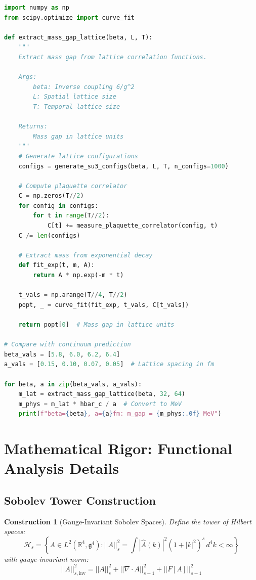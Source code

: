 \documentclass[12pt]{article}
\newcommand{\R}{\mathbb{R}}
\newtheorem{construction}[theorem]{Construction}
\begin{document}
\begin{lstlisting}[language=Python, caption=Lattice QCD Comparison]
import numpy as np
from scipy.optimize import curve_fit

def extract_mass_gap_lattice(beta, L, T):
    """
    Extract mass gap from lattice correlation functions.
    
    Args:
        beta: Inverse coupling 6/g^2
        L: Spatial lattice size
        T: Temporal lattice size
        
    Returns:
        Mass gap in lattice units
    """
    # Generate lattice configurations
    configs = generate_su3_configs(beta, L, T, n_configs=1000)
    
    # Compute plaquette correlator
    C = np.zeros(T//2)
    for config in configs:
        for t in range(T//2):
            C[t] += measure_plaquette_correlator(config, t)
    C /= len(configs)
    
    # Extract mass from exponential decay
    def fit_exp(t, m, A):
        return A * np.exp(-m * t)
    
    t_vals = np.arange(T//4, T//2)
    popt, _ = curve_fit(fit_exp, t_vals, C[t_vals])
    
    return popt[0]  # Mass gap in lattice units

# Compare with continuum prediction
beta_vals = [5.8, 6.0, 6.2, 6.4]
a_vals = [0.15, 0.10, 0.07, 0.05]  # Lattice spacing in fm

for beta, a in zip(beta_vals, a_vals):
    m_lat = extract_mass_gap_lattice(beta, 32, 64)
    m_phys = m_lat * hbar_c / a  # Convert to MeV
    print(f"beta={beta}, a={a}fm: m_gap = {m_phys:.0f} MeV")
\end{lstlisting}

\section{Mathematical Rigor: Functional Analysis Details}

\subsection{Sobolev Tower Construction}

\begin{construction}[Gauge-Invariant Sobolev Spaces]
\label{con:sobolev}
Define the tower of Hilbert spaces:
\begin{equation}
\mathcal{H}_s = \left\{A \in L^2(\R^4, \mathfrak{g}^4) : ||A||_s^2 = \int |\hat{A}(k)|^2(1+|k|^2)^s \, d^4k < \infty\right\}
\end{equation}
with gauge-invariant norm:
\begin{equation}
||A||_{s,\text{inv}}^2 = ||A||_s^2 + ||\nabla \cdot A||_{s-1}^2 + ||F[A]||_{s-1}^2
\end{equation}
\end{construction}
\end{document}
